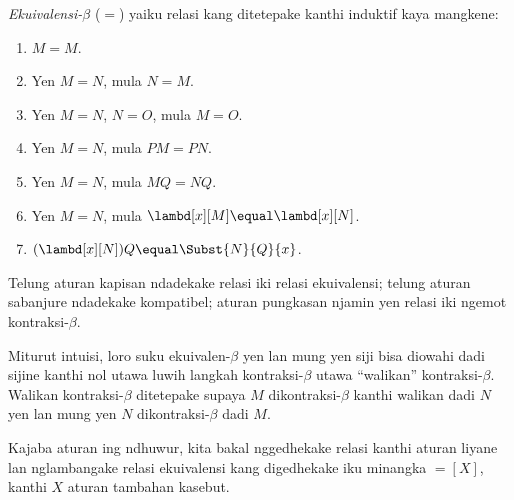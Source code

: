 \documentclass[../../../include/open-logic-section]{subfiles}
\begin{document}
\begin{defn}
  \emph{Ekuivalensi-$\beta$} ($\equal$)
  yaiku relasi kang ditetepake
  kanthi induktif kaya mangkene:
  \begin{enumerate}
  \item $M \equal M$.
  \item Yen $M \equal N$, mula $N \equal M$.
  \item Yen $M \equal N$, $N \equal O$, mula $M \equal O$.
  \item Yen $M \equal N$, mula $PM \equal PN$.
  \item Yen $M \equal N$, mula $MQ \equal NQ$.
  \item Yen $M \equal N$, mula $\lambd[x][M] \equal \lambd[x][N]$.
  \item $(\lambd[x][N])Q \equal \Subst{N}{Q}{x}$.
  \end{enumerate}
\end{defn}

Telung aturan kapisan ndadekake
relasi iki relasi ekuivalensi;
telung aturan sabanjure ndadekake
kompatibel; aturan pungkasan
njamin yen relasi iki ngemot
kontraksi-$\beta$.

Miturut intuisi, loro suku
ekuivalen-$\beta$ yen lan mung yen
siji bisa diowahi dadi sijine
kanthi nol utawa luwih langkah
kontraksi-$\beta$ utawa
``walikan'' kontraksi-$\beta$.
Walikan kontraksi-$\beta$
ditetepake supaya $M$
dikontraksi-$\beta$ kanthi
walikan dadi $N$ yen lan
mung yen $N$ dikontraksi-$\beta$
dadi $M$.

Kajaba aturan ing ndhuwur,
kita bakal nggedhekake relasi
kanthi aturan liyane lan
nglambangake relasi ekuivalensi
kang digedhekake iku minangka
$\equal[X]$, kanthi $X$
aturan tambahan kasebut.
\end{document}
